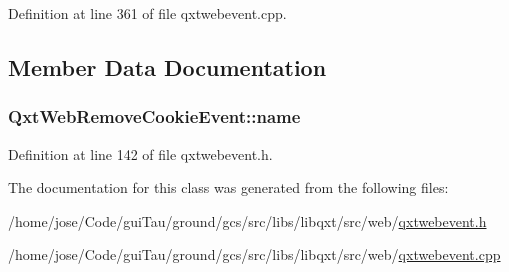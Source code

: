 Definition at line 361 of file qxtwebevent.\-cpp.



\subsection{Member Data Documentation}
\hypertarget{class_qxt_web_remove_cookie_event_a843824ad7369eb86af7c966dc0048657}{
\subsubsection[{name}]{ Qxt\-Web\-Remove\-Cookie\-Event\-::name}}\label{class_qxt_web_remove_cookie_event_a843824ad7369eb86af7c966dc0048657}


Definition at line 142 of file qxtwebevent.\-h.



The documentation for this class was generated from the following files\-:\begin{DoxyCompactItemize}
\item 
/home/jose/\-Code/gui\-Tau/ground/gcs/src/libs/libqxt/src/web/\hyperlink{qxtwebevent_8h}{qxtwebevent.\-h}\item 
/home/jose/\-Code/gui\-Tau/ground/gcs/src/libs/libqxt/src/web/\hyperlink{qxtwebevent_8cpp}{qxtwebevent.\-cpp}\end{DoxyCompactItemize}
